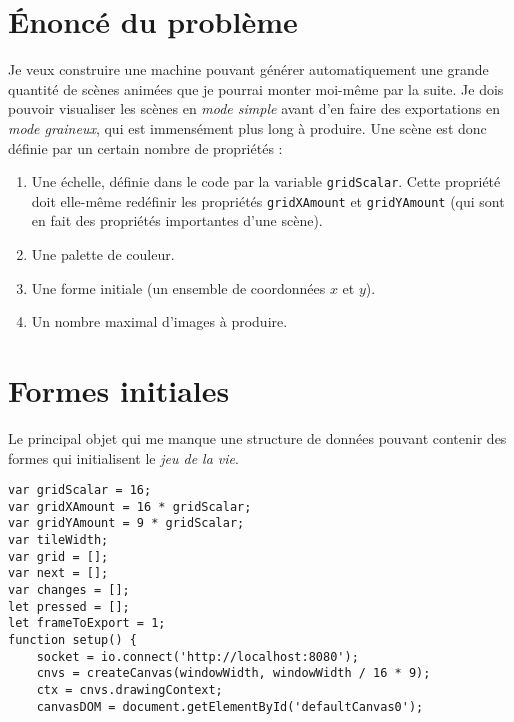 
\section{Énoncé du problème}
\noindent Je veux construire une machine pouvant générer automatiquement une grande quantité de scènes animées que je pourrai monter moi-même par la suite. Je dois pouvoir visualiser les scènes en \textit{mode simple} avant d'en faire des exportations en \textit{mode graineux}, qui est immensément plus long à produire. Une scène est donc définie par un certain nombre de propriétés : 

\begin{enumerate}
\item Une échelle, définie dans le code par la variable \lstinline|gridScalar|. Cette propriété doit elle-même redéfinir les propriétés \lstinline|gridXAmount| et \lstinline|gridYAmount| (qui sont en fait des propriétés importantes d'une scène).
\item Une palette de couleur.
\item Une forme initiale (un ensemble de coordonnées $x$ et $y$).
\item Un nombre maximal d'images à produire.

\end{enumerate}

\section{Formes initiales}
Le principal objet qui me manque une structure de données pouvant contenir des formes qui initialisent le \textit{jeu de la vie}.

\begin{lstlisting}
var gridScalar = 16;
var gridXAmount = 16 * gridScalar;
var gridYAmount = 9 * gridScalar;
var tileWidth;
var grid = [];
var next = [];
var changes = [];
let pressed = [];
let frameToExport = 1;
function setup() {
    socket = io.connect('http://localhost:8080');
    cnvs = createCanvas(windowWidth, windowWidth / 16 * 9);
    ctx = cnvs.drawingContext;
    canvasDOM = document.getElementById('defaultCanvas0');
\end{lstlisting}